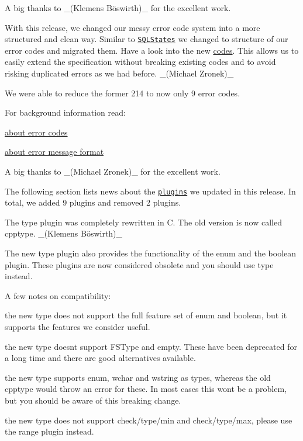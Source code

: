 A big thanks to \+\_\+(Klemens Böswirth)\+\_\+ for the excellent work.

With this release, we changed our messy error code system into a more structured and clean way. Similar to \href{https://www.ibm.com/support/knowledgecenter/en/SSGU8G_12.1.0/com.ibm.sqls.doc/ids_sqs_0809.htm}{\tt S\+Q\+L\+States} we changed to structure of our error codes and migrated them. Have a look into the new \hyperlink{doc_decisions_error_codes_md}{codes}. This allows us to easily extend the specification without breaking existing codes and to avoid risking duplicated errors as we had before. \+\_\+(\+Michael Zronek)\+\_\+

We were able to reduce the former 214 to now only 9 error codes.

For background information read\+:


\begin{DoxyItemize}
\item \hyperlink{doc_decisions_error_codes_md}{about error codes}
\item \hyperlink{doc_decisions_error_message_format_md}{about error message format}
\end{DoxyItemize}

A big thanks to \+\_\+(\+Michael Zronek)\+\_\+ for the excellent work.

The following section lists news about the \href{https://www.libelektra.org/plugins/readme}{\tt plugins} we updated in this release. In total, we added 9 plugins and removed 2 plugins.

The {\ttfamily type} plugin was completely rewritten in C. The old version is now called {\ttfamily cpptype}. \+\_\+(Klemens Böswirth)\+\_\+

The new {\ttfamily type} plugin also provides the functionality of the {\ttfamily enum} and the {\ttfamily boolean} plugin. These plugins are now considered obsolete and you should use {\ttfamily type} instead.

A few notes on compatibility\+:


\begin{DoxyItemize}
\item the new {\ttfamily type} does not support the full feature set of {\ttfamily enum} and {\ttfamily boolean}, but it supports the features we consider useful.
\item the new {\ttfamily type} doesn\textquotesingle{}t support {\ttfamily F\+S\+Type} and {\ttfamily empty}. These have been deprecated for a long time and there are good alternatives available.
\item the new {\ttfamily type} supports {\ttfamily enum}, {\ttfamily wchar} and {\ttfamily wstring} as types, whereas the old {\ttfamily cpptype} would throw an error for these. In most cases this won\textquotesingle{}t be a problem, but you should be aware of this breaking change.
\item the new {\ttfamily type} does not support {\ttfamily check/type/min} and {\ttfamily check/type/max}, please use the {\ttfamily range} plugin instead.
\end{DoxyItemize}

